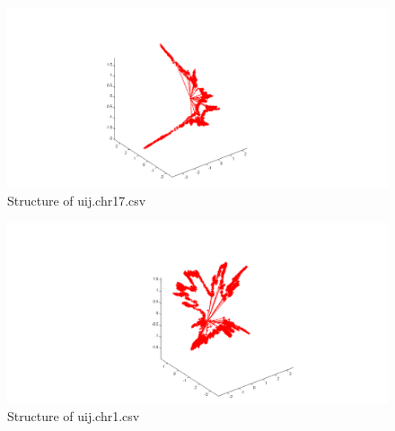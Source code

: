 \documentclass[12pt]{article} %
\begin{document}
\begin{figure}[ht]\centering
	\includegraphics[scale=0.5]{fig004}
	\caption{Structure of uij.chr17.csv}
\end{figure}

\begin{figure}[ht]\centering
	\includegraphics[scale=0.5]{fig005}
	\caption{Structure of uij.chr1.csv}
\end{figure}

\end{document}
